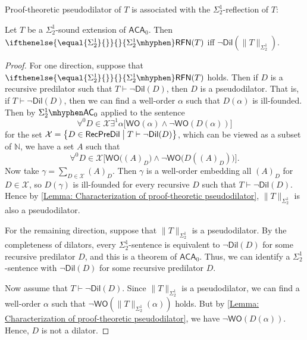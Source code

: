 \documentclass{mhkr}
\newcommand{\added}[1]{#1}
\newcommand{\WO}{\mathsf{WO}}
\newcommand{\Dil}{\mathsf{Dil}}
\newcommand{\RecPreDil}{\mathsf{RecPreDil}}
\newcommand{\RFN}[1][]{\ifthenelse{\equal{#1}{}}{}{#1\mhyphen}\mathsf{RFN}}
\newcommand{\AC}{\mathsf{AC}}
\newcommand{\ACA}{\mathsf{ACA}}
\begin{document}
Proof-theoretic pseudodilator of $T$ is associated with the $\Sigma^1_2$-reflection of $T$:
\begin{proposition}[$\Sigma^1_2\mhyphen\AC_0$] \label{Proposition: Sigma 1 2 reflection and pseudodilators}
    Let $T$ be a $\Sigma^1_2$-sound extension of $\ACA_0$.  
    Then $\RFN[\Sigma^1_2](T)$ iff $\lnot\Dil(\|T\|_{\Sigma^1_2})$. 
\end{proposition}
\begin{proof}
    For one direction, suppose that $\RFN[\Sigma^1_2](T)$ holds. Then if $D$ is a recursive predilator such that $T\vdash\lnot\Dil(D)$, then $D$ is a pseudodilator. That is, if $T\vdash \lnot\Dil(D)$, then we can find a well-order $\alpha$ such that $D(\alpha)$ is ill-founded. 
    Then by $\Sigma^1_2\mhyphen\AC_0$ applied to the sentence
    \begin{equation*}
        \added{\forall^0 D}\in \mathcal{X} \exists^1 \alpha \bigl[\WO(\alpha)\land \lnot\WO(D(\alpha))\bigr]
    \end{equation*}
    for the set $\mathcal{X}=\bigl\{D\in \RecPreDil \bigm| T\vdash \lnot\Dil(D)\bigr\}$, which can be viewed as a subset of $\mathbb{N}$, we have a set $A$ such that
    \begin{equation*}
        \added{\forall^0 D}\in \mathcal{X} \bigl[\WO\bigl((A)_D\bigr) \land \lnot\WO\bigl(D((A)_D)\bigr)\bigr].
    \end{equation*}
    Now take $\gamma = \sum_{D\in \mathcal{X}}(A)_D$. Then $\gamma$ is a well-order embedding all $(A)_D$ for $D\in \mathcal{X}$, so $D(\gamma)$ is ill-founded for every recursive $D$ such that $T\vdash \lnot\Dil(D)$.
    Hence by \autoref{Lemma: Characterization of proof-theoretic pseudodilator}, $\|T\|_{\Sigma^1_2}$ is also a pseudodilator.

    For the remaining direction, suppose that $\|T\|_{\Sigma^1_2}$ is a pseudodilator. By the completeness of dilators, every $\Sigma^1_2$-sentence is equivalent to $\lnot\Dil(D)$ for some recursive predilator $D$, and this is a theorem of $\ACA_0$. Thus, we can identify a $\Sigma^1_2$-sentence with $\lnot\Dil(D)$ for some recursive predilator $D$.

    Now assume that $T\vdash\lnot\Dil(D)$. Since $\|T\|_{\Sigma^1_2}$ is a pseudodilator, we can find a well-order $\alpha$ such that $\lnot\WO(\|T\|_{\Sigma^1_2}(\alpha))$ holds. But by \autoref{Lemma: Characterization of proof-theoretic pseudodilator}, we have $\lnot\WO(D(\alpha))$. Hence, $D$ is not a dilator.
\end{proof}
\end{document}
